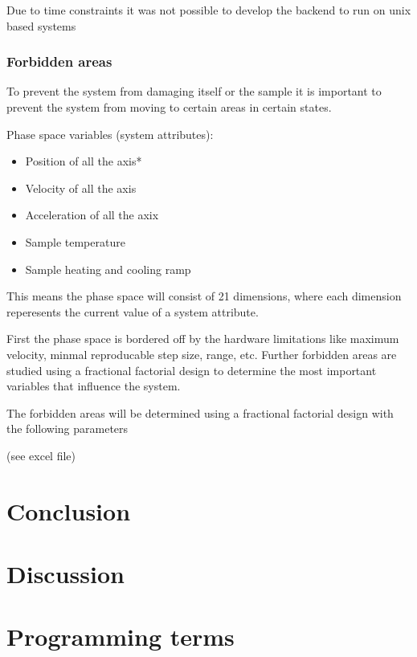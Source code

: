 \documentclass[11pt]{article}
\begin{document}
Due to time constraints it was not possible to develop the backend to run on unix based systems


\subsubsection{Forbidden areas}
To prevent the system from damaging itself or the sample it is important to prevent the system from moving to certain areas in certain states.

Phase space variables (system attributes):
\begin{itemize}
    \item Position of all the axis*
    \item Velocity of all the axis
    \item Acceleration of all the axix
    \item Sample temperature
    \item Sample heating and cooling ramp
\end{itemize}

This means the phase space will consist of 21 dimensions, where each dimension reperesents the current value of a system attribute.

First the phase space is bordered off by the hardware limitations like maximum velocity, minmal reproducable step size, range, etc.
Further forbidden areas are studied using a fractional factorial design to determine the most important variables that influence the system.

The forbidden areas will be determined using a fractional factorial design with the following parameters

(see excel file)




\clearpage
\section{Conclusion}

\section{Discussion}


\newpage



\clearpage
\appendix

\section{Programming terms}
\label{ap:programming_terms}
\end{document}
